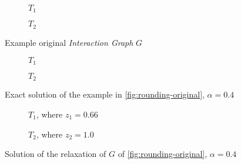 \begin{figure}
	\begin{center}
		\begin{subfigure}[b]{0.4\textwidth}
			\centering
			\caption{$T_1$}
			\label{fig:rounding-original-t1}
		\end{subfigure}
		\begin{subfigure}[b]{0.4\textwidth}
			\centering
			\caption{$T_2$}
			\label{fig:rounding-original-t2}
		\end{subfigure}
	\end{center}
	\caption{Example original \emph{Interaction Graph} $G$}
	\label{fig:rounding-original}
\end{figure}
\begin{figure}
	\begin{center}
		\begin{subfigure}[b]{0.4\textwidth}
			\centering
			\caption{$T_1$}
			\label{fig:rounding-integer-t1}
		\end{subfigure}
		\begin{subfigure}[b]{0.4\textwidth}
			\centering
			\caption{$T_2$}
			\label{fig:rounding-original-t2}
		\end{subfigure}
	\end{center}
	\caption{Exact solution of the example in \autoref{fig:rounding-original},
		$\alpha = 0.4$}
	\label{fig:rounding-integer}
\end{figure}
\begin{figure}
	\begin{center}
		\begin{subfigure}[b]{0.4\textwidth}
			\centering
			\caption{$T_1$, where $z_1 = 0.66$}
			\label{fig:rounding-relaxed-t1}
		\end{subfigure}
		\begin{subfigure}[b]{0.4\textwidth}
			\centering
			\caption{$T_2$, where $z_2 = 1.0$}
			\label{fig:rounding-relaxed-t2}
		\end{subfigure}
	\end{center}
	\caption{Solution of the relaxation of $G$ of
		\autoref{fig:rounding-original}, $\alpha = 0.4$}
	\label{fig:rounding-relaxed}
\end{figure}

